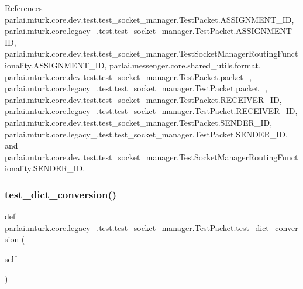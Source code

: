 References parlai.\+mturk.\+core.\+dev.\+test.\+test\+\_\+socket\+\_\+manager.\+Test\+Packet.\+A\+S\+S\+I\+G\+N\+M\+E\+N\+T\+\_\+\+ID, parlai.\+mturk.\+core.\+legacy\+\_.\+test.\+test\+\_\+socket\+\_\+manager.\+Test\+Packet.\+A\+S\+S\+I\+G\+N\+M\+E\+N\+T\+\_\+\+ID, parlai.\+mturk.\+core.\+dev.\+test.\+test\+\_\+socket\+\_\+manager.\+Test\+Socket\+Manager\+Routing\+Functionality.\+A\+S\+S\+I\+G\+N\+M\+E\+N\+T\+\_\+\+ID, parlai.\+messenger.\+core.\+shared\+\_\+utils.\+format, parlai.\+mturk.\+core.\+dev.\+test.\+test\+\_\+socket\+\_\+manager.\+Test\+Packet.\+packet\+\_, parlai.\+mturk.\+core.\+legacy\+\_.\+test.\+test\+\_\+socket\+\_\+manager.\+Test\+Packet.\+packet\+\_, parlai.\+mturk.\+core.\+dev.\+test.\+test\+\_\+socket\+\_\+manager.\+Test\+Packet.\+R\+E\+C\+E\+I\+V\+E\+R\+\_\+\+ID, parlai.\+mturk.\+core.\+legacy\+\_.\+test.\+test\+\_\+socket\+\_\+manager.\+Test\+Packet.\+R\+E\+C\+E\+I\+V\+E\+R\+\_\+\+ID, parlai.\+mturk.\+core.\+dev.\+test.\+test\+\_\+socket\+\_\+manager.\+Test\+Packet.\+S\+E\+N\+D\+E\+R\+\_\+\+ID, parlai.\+mturk.\+core.\+legacy\+\_.\+test.\+test\+\_\+socket\+\_\+manager.\+Test\+Packet.\+S\+E\+N\+D\+E\+R\+\_\+\+ID, and parlai.\+mturk.\+core.\+dev.\+test.\+test\+\_\+socket\+\_\+manager.\+Test\+Socket\+Manager\+Routing\+Functionality.\+S\+E\+N\+D\+E\+R\+\_\+\+ID.

\mbox{\label{classparlai_1_1mturk_1_1core_1_1legacy__2018_1_1test_1_1test__socket__manager_1_1TestPacket_ac82c40c2b349723a7b0b938331a1a75e}} 
\subsubsection{\texorpdfstring{test\+\_\+dict\+\_\+conversion()}{test\_dict\_conversion()}}
{\footnotesize\ttfamily def parlai.\+mturk.\+core.\+legacy\+\_.\+test.\+test\+\_\+socket\+\_\+manager.\+Test\+Packet.\+test\+\_\+dict\+\_\+conversion (\begin{DoxyParamCaption}\item[{}]{self }\end{DoxyParamCaption})}


